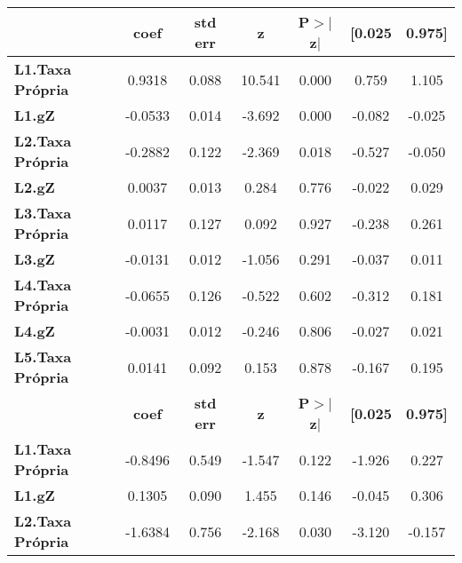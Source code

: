 \begin{center}
\begin{tabular}{lcccccc}
\toprule
                         & \textbf{coef} & \textbf{std err} & \textbf{z} & \textbf{P$> |$z$|$} & \textbf{[0.025} & \textbf{0.975]}  \\
\midrule
\textbf{L1.Taxa Própria} &       0.9318  &        0.088     &    10.541  &         0.000        &        0.759    &        1.105     \\
\textbf{L1.gZ}           &      -0.0533  &        0.014     &    -3.692  &         0.000        &       -0.082    &       -0.025     \\
\textbf{L2.Taxa Própria} &      -0.2882  &        0.122     &    -2.369  &         0.018        &       -0.527    &       -0.050     \\
\textbf{L2.gZ}           &       0.0037  &        0.013     &     0.284  &         0.776        &       -0.022    &        0.029     \\
\textbf{L3.Taxa Própria} &       0.0117  &        0.127     &     0.092  &         0.927        &       -0.238    &        0.261     \\
\textbf{L3.gZ}           &      -0.0131  &        0.012     &    -1.056  &         0.291        &       -0.037    &        0.011     \\
\textbf{L4.Taxa Própria} &      -0.0655  &        0.126     &    -0.522  &         0.602        &       -0.312    &        0.181     \\
\textbf{L4.gZ}           &      -0.0031  &        0.012     &    -0.246  &         0.806        &       -0.027    &        0.021     \\
\textbf{L5.Taxa Própria} &       0.0141  &        0.092     &     0.153  &         0.878        &       -0.167    &        0.195     \\
                         & \textbf{coef} & \textbf{std err} & \textbf{z} & \textbf{P$> |$z$|$} & \textbf{[0.025} & \textbf{0.975]}  \\
\midrule
\textbf{L1.Taxa Própria} &      -0.8496  &        0.549     &    -1.547  &         0.122        &       -1.926    &        0.227     \\
\textbf{L1.gZ}           &       0.1305  &        0.090     &     1.455  &         0.146        &       -0.045    &        0.306     \\
\textbf{L2.Taxa Própria} &      -1.6384  &        0.756     &    -2.168  &         0.030        &       -3.120    &       -0.157     \\

\end{tabular}
\end{center}
